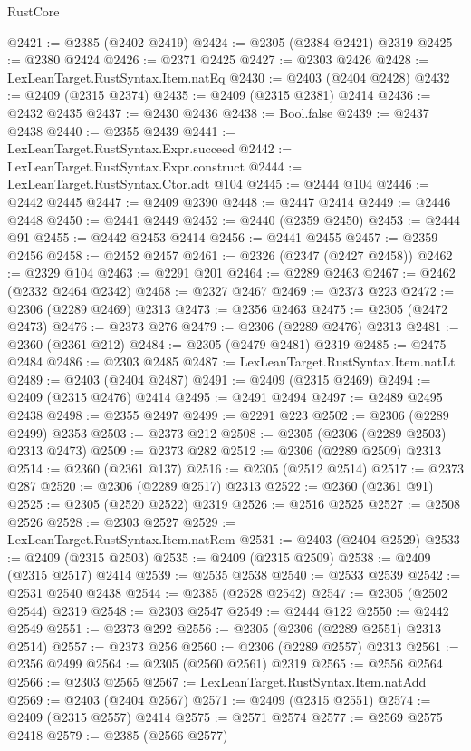 \begin{lexlean}{RustCore}
\begin{coremodule}
@2421 := @2385 (@2402 @2419)
@2424 := @2305 (@2384 @2421) @2319
@2425 := @2380 @2424
@2426 := @2371 @2425
@2427 := @2303 @2426
@2428 := LexLeanTarget.RustSyntax.Item.natEq
@2430 := @2403 (@2404 @2428)
@2432 := @2409 (@2315 @2374)
@2435 := @2409 (@2315 @2381) @2414
@2436 := @2432 @2435
@2437 := @2430 @2436
@2438 := Bool.false
@2439 := @2437 @2438
@2440 := @2355 @2439
@2441 := LexLeanTarget.RustSyntax.Expr.succeed
@2442 := LexLeanTarget.RustSyntax.Expr.construct
@2444 := LexLeanTarget.RustSyntax.Ctor.adt @104
@2445 := @2444 @104
@2446 := @2442 @2445
@2447 := @2409 @2390
@2448 := @2447 @2414
@2449 := @2446 @2448
@2450 := @2441 @2449
@2452 := @2440 (@2359 @2450)
@2453 := @2444 @91
@2455 := @2442 @2453 @2414
@2456 := @2441 @2455
@2457 := @2359 @2456
@2458 := @2452 @2457
@2461 := @2326 (@2347 (@2427 @2458))
@2462 := @2329 @104
@2463 := @2291 @201
@2464 := @2289 @2463
@2467 := @2462 (@2332 @2464 @2342)
@2468 := @2327 @2467
@2469 := @2373 @223
@2472 := @2306 (@2289 @2469) @2313
@2473 := @2356 @2463
@2475 := @2305 (@2472 @2473)
@2476 := @2373 @276
@2479 := @2306 (@2289 @2476) @2313
@2481 := @2360 (@2361 @212)
@2484 := @2305 (@2479 @2481) @2319
@2485 := @2475 @2484
@2486 := @2303 @2485
@2487 := LexLeanTarget.RustSyntax.Item.natLt
@2489 := @2403 (@2404 @2487)
@2491 := @2409 (@2315 @2469)
@2494 := @2409 (@2315 @2476) @2414
@2495 := @2491 @2494
@2497 := @2489 @2495 @2438
@2498 := @2355 @2497
@2499 := @2291 @223
@2502 := @2306 (@2289 @2499) @2353
@2503 := @2373 @212
@2508 := @2305 (@2306 (@2289 @2503) @2313 @2473)
@2509 := @2373 @282
@2512 := @2306 (@2289 @2509) @2313
@2514 := @2360 (@2361 @137)
@2516 := @2305 (@2512 @2514)
@2517 := @2373 @287
@2520 := @2306 (@2289 @2517) @2313
@2522 := @2360 (@2361 @91)
@2525 := @2305 (@2520 @2522) @2319
@2526 := @2516 @2525
@2527 := @2508 @2526
@2528 := @2303 @2527
@2529 := LexLeanTarget.RustSyntax.Item.natRem
@2531 := @2403 (@2404 @2529)
@2533 := @2409 (@2315 @2503)
@2535 := @2409 (@2315 @2509)
@2538 := @2409 (@2315 @2517) @2414
@2539 := @2535 @2538
@2540 := @2533 @2539
@2542 := @2531 @2540 @2438
@2544 := @2385 (@2528 @2542)
@2547 := @2305 (@2502 @2544) @2319
@2548 := @2303 @2547
@2549 := @2444 @122
@2550 := @2442 @2549
@2551 := @2373 @292
@2556 := @2305 (@2306 (@2289 @2551) @2313 @2514)
@2557 := @2373 @256
@2560 := @2306 (@2289 @2557) @2313
@2561 := @2356 @2499
@2564 := @2305 (@2560 @2561) @2319
@2565 := @2556 @2564
@2566 := @2303 @2565
@2567 := LexLeanTarget.RustSyntax.Item.natAdd
@2569 := @2403 (@2404 @2567)
@2571 := @2409 (@2315 @2551)
@2574 := @2409 (@2315 @2557) @2414
@2575 := @2571 @2574
@2577 := @2569 @2575 @2418
@2579 := @2385 (@2566 @2577)

\end{coremodule}
\end{lexlean}
